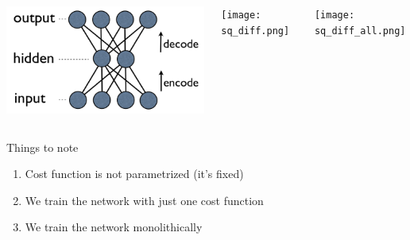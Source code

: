 \documentclass{Bredelebeamer}
\begin{document}
\begin{frame}
	\begin{columns}
	\begin{column}{0.3\textwidth}
		\includegraphics[width=\textwidth]{autoencoder_bad_diagram.png}
	\end{column}
	\pause
	\begin{column}{0.33\textwidth}
		\texttt{[image: sq\_diff.png]}
	\end{column}
	\pause
	\begin{column}{0.34\textwidth}
		\texttt{[image: sq\_diff\_all.png]}
	\end{column}
	\end{columns}
	\pause[4]
	\begin{block}{Things to note}
	\begin{enumerate}
		\item Cost function is not parametrized (it's fixed)
		\item We train the network with just one cost function
		\item We train the network monolithically
	\end{enumerate}
	\end{block}
\end{frame}
\end{document}
